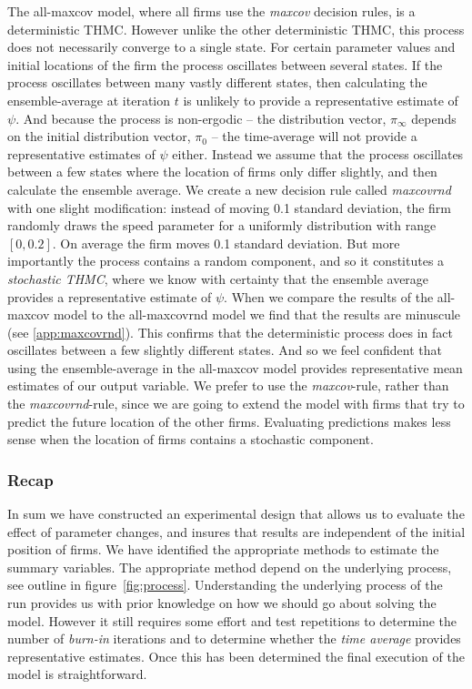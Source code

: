 \documentclass[preprint, 12pt]{elsarticle}
\begin{document}
The all-maxcov model, where all firms use the \emph{maxcov} decision rules, is a deterministic THMC. However unlike the other deterministic THMC, this process does not necessarily converge to a single state. For certain parameter values and initial locations of the firm the process oscillates between several states. If the process oscillates between many vastly different states, then calculating the ensemble-average at iteration $t$ is unlikely to provide a representative estimate of $\psi$. And because the process is non-ergodic -- the distribution vector, $\pi_\infty$ depends on the initial distribution vector, $\pi_0$ -- the time-average will not provide a representative estimates of $\psi$ either. Instead we assume that the process oscillates between a few states where the location of firms only differ slightly, and then calculate the ensemble average. We create a new decision rule called \emph{maxcovrnd} with one slight modification: instead of moving 0.1 standard deviation, the firm randomly draws the speed parameter for a uniformly distribution with range $[0,0.2]$. On average the firm moves 0.1 standard deviation. But more importantly the process contains a random component, and so it constitutes a \emph{stochastic THMC}, where we know with certainty that the ensemble average provides a representative estimate of $\psi$. When we compare the results of the all-maxcov model to the all-maxcovrnd model we find that the results are minuscule (see \ref{app:maxcovrnd}). This confirms that the deterministic process does in fact oscillates between a few slightly different states. And so we feel confident that using the ensemble-average in the all-maxcov model provides representative mean estimates of our output variable. We prefer to use the \emph{maxcov}-rule, rather than the \emph{maxcovrnd}-rule, since we are going to extend the model with firms that try to predict the future location of the other firms. Evaluating predictions makes less sense when the location of firms contains a stochastic component.

\subsubsection*{Recap}

In sum we have constructed an experimental design that allows us to evaluate the effect of parameter changes, and insures that results are independent of the initial position of firms. We have identified the appropriate methods to estimate the summary variables. The appropriate method depend on the underlying process, see outline in figure~\ref{fig:process}. Understanding the underlying process of the run provides us with prior knowledge on how we should go about solving the model. However it still requires some effort and test repetitions to determine the number of \emph{burn-in} iterations and to determine whether the \emph{time average} provides representative estimates. Once this has been determined the final execution of the model is straightforward.
\end{document}
